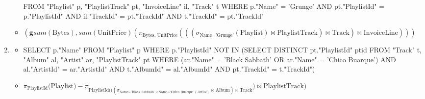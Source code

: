 \documentclass[10pt]{article}
\begin{document}
\begin{enumerate}[label=\arabic*.]
\begin{itemize}
    FROM "Playlist" p, "PlaylistTrack" pt, "InvoiceLine" il, "Track" t
    WHERE p."Name" = 'Grunge' AND pt."PlaylistId" = p."PlaylistId" AND il."TrackId" = pt."TrackId" AND t."TrackId" = pt."TrackId"
    \item
    $(\textbf{g} sum(\text{Bytes}), sum(\text{UnitPrice})(\pi_{\text{Bytes, UnitPrice}}(((\sigma_{\text{Name='Grunge'}}(\text{Playlist}) \bowtie \text{PlaylistTrack}) \bowtie \text{Track}) \bowtie \text{InvoiceLine})))$
    \end{itemize}
  \item
  	\begin{itemize}
    \item
    SELECT p."Name" FROM "Playlist" p
    WHERE p."PlaylistId" NOT IN (SELECT DISTINCT pt."PlaylistId" ptid FROM "Track" t, "Album" al, "Artist" ar, "PlaylistTrack" pt
    WHERE (ar."Name" = 'Black Sabbath' OR ar."Name" = 'Chico Buarque') AND al."ArtistId" = ar."ArtistId" AND t."AlbumId" = al."AlbumId" AND pt."TrackId" = t."TrackId")
    \item
    $\pi_{\text{PlaylistId}}\text{(Playlist}) - \pi_{\text{PlaylistId}(((\sigma_{\text{Name='Black Sabbath'} \vee \text{Name='Chico Buarque'}(Artist)} \bowtie \text{Album}) \bowtie \text{Track}}) \bowtie \text{PlaylistTrack})$
    \end{itemize}
\end{enumerate}
\end{document}

